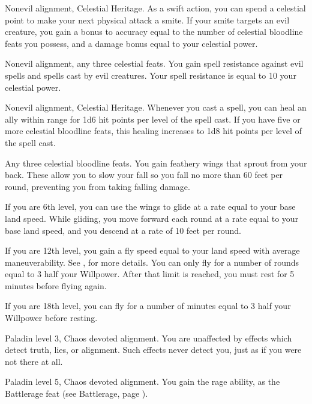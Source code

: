 \featpres Nonevil alignment, Celestial Heritage.
\featben As a swift action, you can spend a celestial point to make your next physical attack a smite.
If your smite targets an evil creature, you gain a bonus to accuracy equal to the number of celestial bloodline feats you possess, and a damage bonus equal to your celestial power.

\featpres Nonevil alignment, any three celestial feats.
\featben You gain spell resistance against evil spells and spells cast by evil creatures.
Your spell resistance is equal to 10 \add your celestial power.

\featpres Nonevil alignment, Celestial Heritage.
\featben Whenever you cast a spell, you can heal an ally within \rngclose range for 1d6 hit points per level of the spell cast.
If you have five or more celestial bloodline feats, this healing increases to 1d8 hit points per level of the spell cast.

\featpre Any three celestial bloodline feats.
\featben You gain feathery wings that sprout from your back.
These allow you to slow your fall so you fall no more than 60 feet per round, preventing you from taking falling damage.

If you are 6th level, you can use the wings to glide at a rate equal to your base land speed.
While gliding, you move forward each round at a rate equal to your base land speed, and you descend at a rate of 10 feet per round.

If you are 12th level, you gain a fly speed equal to your land speed with average maneuverability.
See , for more details.
You can only fly for a number of rounds equal to 3 \add half your Willpower.
After that limit is reached, you must rest for 5 minutes before flying again.

If you are 18th level, you can fly for a number of minutes equal to 3 \add half your Willpower before resting.

\featpres Paladin level 3, Chaos devoted alignment.
\featben You are unaffected by effects which detect truth, lies, or alignment.
Such effects never detect you, just as if you were not there at all.

\featpres Paladin level 5, Chaos devoted alignment.
\featben You gain the rage ability, as the Battlerage feat (see Battlerage, page ).


